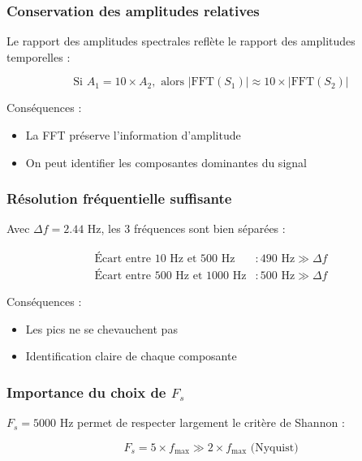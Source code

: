 \documentclass[12pt,a4paper]{article}
\begin{document}
\subsubsection{Conservation des amplitudes relatives}

Le rapport des amplitudes spectrales reflète le rapport des amplitudes temporelles :

\begin{equation}
    \text{Si } A_1 = 10 \times A_2, \text{ alors } |\text{FFT}(S_1)| \approx 10 \times |\text{FFT}(S_2)|
\end{equation}

Conséquences :
\begin{itemize}
    \item La FFT préserve l'information d'amplitude
    \item On peut identifier les composantes dominantes du signal
\end{itemize}

\subsubsection{Résolution fréquentielle suffisante}

Avec $\Delta f = 2.44$ Hz, les 3 fréquences sont bien séparées :

\begin{align}
    \text{Écart entre 10 Hz et 500 Hz} &: 490 \text{ Hz} \gg \Delta f \\
    \text{Écart entre 500 Hz et 1000 Hz} &: 500 \text{ Hz} \gg \Delta f
\end{align}

Conséquences :
\begin{itemize}
    \item Les pics ne se chevauchent pas
    \item Identification claire de chaque composante
\end{itemize}

\subsubsection{Importance du choix de $F_s$}

$F_s = 5000$ Hz permet de respecter largement le critère de Shannon :

\begin{equation}
    F_s = 5 \times f_{\max} \gg 2 \times f_{\max} \text{ (Nyquist)}
\end{equation}
\end{document}
